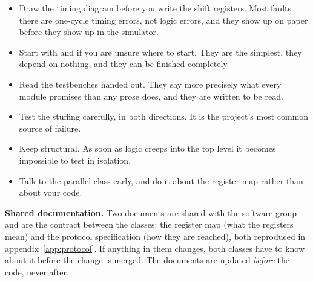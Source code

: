 \begin{itemize}
  \item Draw the timing diagram before you write the shift registers. Most faults there are one-cycle
    timing errors, not logic errors, and they show up on paper before they show up in the simulator.
  \item Start with  and  if you are unsure where to start. They are the
    simplest, they depend on nothing, and they can be finished completely.
  \item Read the testbenches handed out. They say more precisely what every module promises than any
    prose does, and they are written to be read.
  \item Test the stuffing carefully, in both directions. It is the project's most common source of
    failure.
  \item Keep  structural. As soon as logic creeps into the top level it becomes
    impossible to test in isolation.
  \item Talk to the parallel class early, and do it about the register map rather than about your
    code.
\end{itemize}

\begin{aside}
\textbf{Shared documentation.} Two documents are shared with the software group and are the contract
between the classes: the register map (what the registers mean) and the protocol specification (how
they are reached), both reproduced in appendix~\ref{app:protocol}. If anything in them changes, both
classes have to know about it before the change is merged. The documents are updated \emph{before} the
code, never after.
\end{aside}

